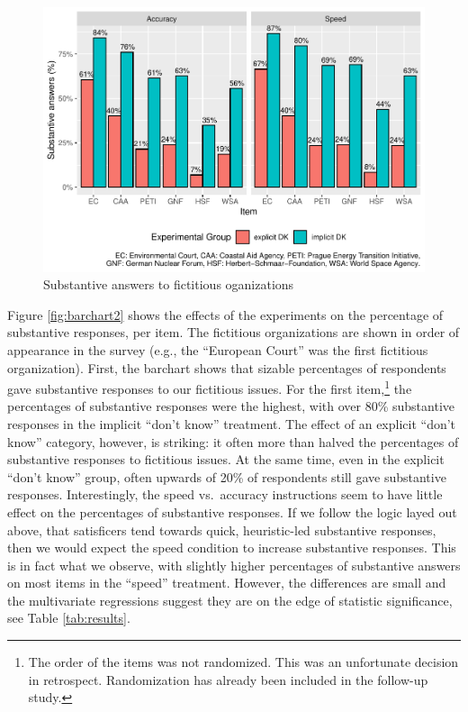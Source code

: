 \documentclass[Royal,times,sageh]{sagej}
\begin{document}
\begin{figure}
\includegraphics[width=1\linewidth]{article_files/figure-latex/barchart-1} \caption{\label{fig:barchart2}Substantive answers to fictitious oganizations}\label{fig:barchart}
\end{figure}

Figure \ref{fig:barchart2} shows the effects of the experiments on the
percentage of substantive responses, per item. The fictitious
organizations are shown in order of appearance in the survey (e.g., the
``European Court'' was the first fictitious organization). First, the
barchart shows that sizable percentages of respondents gave substantive
responses to our fictitious issues. For the first item,\footnote{The
  order of the items was not randomized. This was an unfortunate
  decision in retrospect. Randomization has already been included in the
  follow-up study.} the percentages of substantive responses were the
highest, with over 80\% substantive responses in the implicit ``don't
know'' treatment. The effect of an explicit ``don't know'' category,
however, is striking: it often more than halved the percentages of
substantive responses to fictitious issues. At the same time, even in
the explicit ``don't know'' group, often upwards of 20\% of respondents
still gave substantive responses. Interestingly, the speed vs.~accuracy
instructions seem to have little effect on the percentages of
substantive responses. If we follow the logic layed out above, that
satisficers tend towards quick, heuristic-led substantive responses,
then we would expect the speed condition to increase substantive
responses. This is in fact what we observe, with slightly higher
percentages of substantive answers on most items in the ``speed''
treatment. However, the differences are small and the multivariate
regressions suggest they are on the edge of statistic significance, see
Table \ref{tab:results}.
\end{document}
